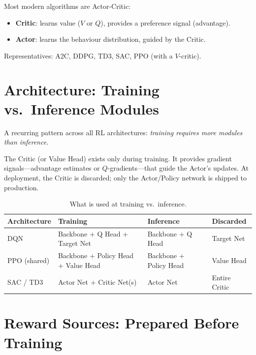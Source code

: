 Most modern algorithms are Actor-Critic:
\begin{itemize}
  \item \textbf{Critic}: learns value ($V$ or $Q$), provides a preference signal (advantage).
  \item \textbf{Actor}: learns the behaviour distribution, guided by the Critic.
\end{itemize}
Representatives: A2C, DDPG, TD3, SAC, PPO (with a $V$-critic).

\section{Architecture: Training vs.\ Inference Modules}
\label{sec:architecture}

A recurring pattern across all RL architectures: \emph{training requires more modules than inference}.

\begin{keyidea}[Critic = Scaffolding]
The Critic (or Value Head) exists only during training.
It provides gradient signals---advantage estimates or $Q$-gradients---that guide the Actor's updates.
At deployment, the Critic is discarded; only the Actor/Policy network is shipped to production.
\end{keyidea}

\begin{table}[htbp]
\centering
\caption{What is used at training vs.\ inference.}
\begin{tabular}{@{}llll@{}}
\toprule
\textbf{Architecture} & \textbf{Training} & \textbf{Inference} & \textbf{Discarded} \\
\midrule
DQN & Backbone + Q Head + Target Net & Backbone + Q Head & Target Net \\
PPO (shared) & Backbone + Policy Head + Value Head & Backbone + Policy Head & Value Head \\
SAC / TD3 & Actor Net + Critic Net(s) & Actor Net & Entire Critic \\
\bottomrule
\end{tabular}
\end{table}

\section{Reward Sources: Prepared Before Training}
\label{sec:reward-sources}

